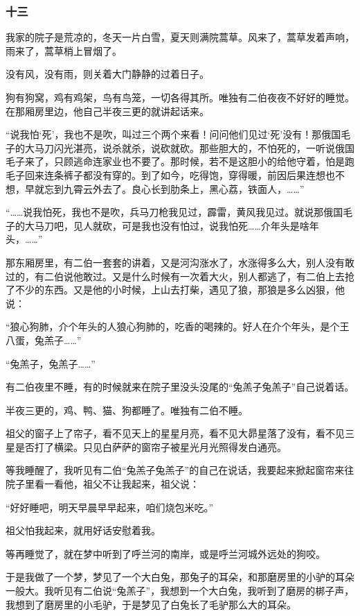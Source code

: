 \subsubsection*{十三}
\par 我家的院子是荒凉的，冬天一片白雪，夏天则满院蒿草。风来了，蒿草发着声响，雨来了，蒿草梢上冒烟了。
\par 没有风，没有雨，则关着大门静静的过着日子。
\par 狗有狗窝，鸡有鸡架，鸟有鸟笼，一切各得其所。唯独有二伯夜夜不好好的睡觉。在那厢房里边，他自己半夜三更的就讲起话来。
\par “说我怕‘死’，我也不是吹，叫过三个两个来看！问问他们见过‘死’没有！那俄国毛子的大马刀闪光湛亮，说杀就杀，说砍就砍。那些胆大的，不怕死的，一听说俄国毛子来了，只顾逃命连家业也不要了。那时候，若不是这胆小的给他守着，怕是跑毛子回来连条裤子都没有穿的。到了如今，吃得饱，穿得暖，前因后果连想也不想，早就忘到九霄云外去了。良心长到肋条上，黑心荔，铁面人，……”
\par “……说我怕死，我也不是吹，兵马刀枪我见过，霹雷，黄风我见过。就说那俄国毛子的大马刀吧，见人就砍，可是我也没有怕过，说我怕死……介年头是啥年头，……”
\par 那东厢房里，有二伯一套套的讲着，又是河沟涨水了，水涨得多么大，别人没有敢过的，有二伯说他敢过。又是什么时候有一次着大火，别人都逃了，有二伯上去抢了不少的东西。又是他的小时候，上山去打柴，遇见了狼，那狼是多么凶狠，他说：
\par “狼心狗肺，介个年头的人狼心狗肺的，吃香的喝辣的。好人在介个年头，是个王八蛋，兔羔子……”
\par “兔羔子，兔羔子……”
\par 有二伯夜里不睡，有的时候就来在院子里没头没尾的“兔羔子兔羔子”自己说着话。
\par 半夜三更的，鸡、鸭、猫、狗都睡了。唯独有二伯不睡。
\par 祖父的窗子上了帘子，看不见天上的星星月亮，看不见大昴星落了没有，看不见三星是否打了横梁。只见白萨萨的窗帘子被星光月光照得发白通亮。
\par 等我睡醒了，我听见有二伯“兔羔子兔羔子”的自己在说话，我要起来掀起窗帘来往院子里看一看他，祖父不让我起来，祖父说：
\par “好好睡吧，明天早晨早早起来，咱们烧包米吃。”
\par 祖父怕我起来，就用好话安慰着我。
\par 等再睡觉了，就在梦中听到了呼兰河的南岸，或是呼兰河城外远处的狗咬。
\par 于是我做了一个梦，梦见了一个大白兔，那兔子的耳朵，和那磨房里的小驴的耳朵一般大。我听见有二伯说“兔羔子”，我想到一个大白兔，我听到了磨房的梆子声，我想到了磨房里的小毛驴，于是梦见了白兔长了毛驴那么大的耳朵。
